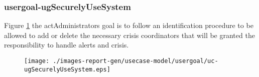 \subsubsection{usergoal-ugSecurelyUseSystem}

\label{RE-use-case-ugSecurelyUseSystem}



Figure \ref{fig:lu.uni.lassy.excalibur.myproject-RE-UCD-uc-ugSecurelyUseSystem}
the actAdministrators goal is to follow an identification procedure to be allowed to add or delete the
necessary crisis coordinators that will be granted the responsibility to handle alerts and crisis.

\begin{figure}[htbp]
\begin{center}

\texttt{[image: ./images-report-gen/usecase-model/usergoal/uc-ugSecurelyUseSystem.eps]}
\end{center}
\caption[lu.uni.lassy.excalibur.myproject Use Case Diagram: uc-ugSecurelyUseSystem]{}
\label{fig:lu.uni.lassy.excalibur.myproject-RE-UCD-uc-ugSecurelyUseSystem}
\end{figure}
\vspace{0.5cm}
